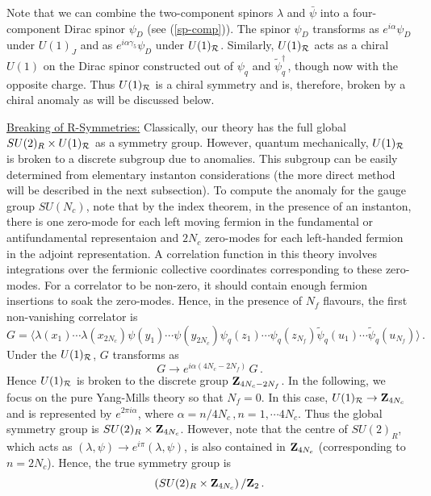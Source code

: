 Note that we can combine the two-component spinors $\lambda$ and
$\bar\psi$ into a four-component Dirac spinor $\psi_D$ (see
(\ref{sp-comp})). The spinor $\psi_D$ transforms as $e^{i\alpha}
\psi_D$ under $U(1)_J$ and as $e^{i\alpha\gamma_5}\psi_D$ under
$U(1)_{\cal R}$. Similarly, $U(1)_{\cal R}$ acts as a chiral $U(1)$ on
the Dirac spinor constructed out of $\psi_q$ and $\widetilde
\psi_q^\dagger$\,, though now with the opposite charge. Thus
$U(1)_{\cal R}$ is a chiral symmetry and is, therefore, broken by  
a chiral anomaly as will be discussed below. 

\noindent\underline{Breaking of R-Symmetries:} 
Classically, our theory has the full global $SU(2)_R\times U(1)_{\cal
R}$ as a symmetry group. However, quantum mechanically, $U(1)_{\cal
R}$ is broken to a discrete subgroup due to anomalies. This subgroup
can be easily determined from elementary instanton considerations (the
more direct method will be described in the next subsection). To
compute the anomaly for the gauge group $SU(N_c)$, note that by the
index theorem, in the presence of an instanton, there is one zero-mode
for each left moving fermion in the fundamental or antifundamental
representaion and $2N_c$ zero-modes for each left-handed fermion in
the adjoint representation. A correlation function in this theory
involves integrations over the fermionic collective coordinates
corresponding to these zero-modes. For a correlator to be non-zero, it
should contain enough fermion insertions to soak the zero-modes. 
Hence, in the presence of $N_f$ flavours, the first non-vanishing
correlator is 
\begin{equation}
G=\langle\lambda(x_1)\cdots\lambda(x_{2N_c})\psi(y_1)\cdots\psi(y_{2N_c})
\psi_q(z_1)\cdots\psi_q(z_{N_f})\widetilde\psi_q(u_1)\cdots
\widetilde\psi_q(u_{N_f})\rangle \,.
\label{G}
\end{equation}
Under the $U(1)_{\cal R}$, $G$ transforms as
$$
G \rightarrow e^{i\alpha(4N_c-2N_f)}\,G\,.
$$
Hence $U(1)_{\cal R}$ is broken to the discrete group 
${\bf Z}_{4N_c-2N_f}$. In the following, we focus on the pure
Yang-Mills theory so that $N_f=0$. In this case, $U(1)_{\cal
  R}\rightarrow {\bf Z}_{4N_c}$ and is represented by $e^{2\pi
  i\alpha}$, where  $\alpha=n/4N_c\,, n=1,\cdots 4N_c$. Thus the
global symmetry group is $SU(2)_R\times {\bf Z}_{4N_c}$. However, note
that the centre of $SU(2)_R$, which acts as $(\lambda,\psi)\rightarrow
e^{i\pi}(\lambda,\psi)$, is also contained in ${\bf Z}_{4N_c}$
(corresponding to $n=2N_c$). Hence, the true symmetry group is  
$$
\left(SU(2)_R\times {\bf Z}_{4N_c}\right)/{\bf Z}_2\,.
$$

